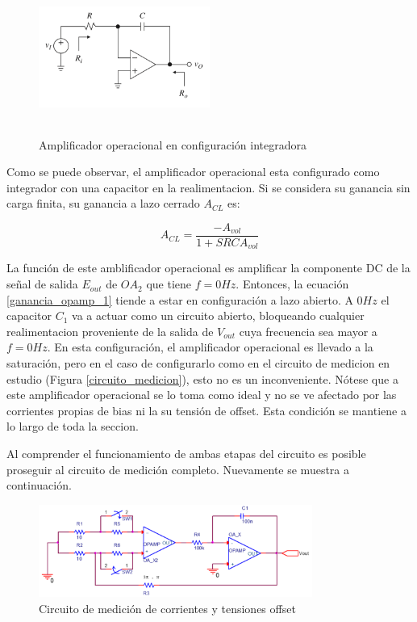 \begin{figure}[ht]                                                       
    \centering\includegraphics[width=0.5\textwidth, height=5cm]{../Ex3/Figuras/fig_4.png}
     \caption{Amplificador operacional en configuración integradora}
     \label{fig_4}
     \end{figure}


Como se puede observar, el amplificador operacional esta configurado como integrador con una capacitor en la realimentacion. Si se considera su ganancia sin carga finita, su ganancia a lazo cerrado $A_{CL}$ es:

\begin{equation} A_{CL}= \frac{-A_{vol}}{1+SRC A_{vol}}  \label{ganancia_opamp_1} \end{equation}

La función de este amblificador operacional es amplificar la componente DC de la señal de salida $E_{out}$ de $OA_2$ que tiene $f=0Hz$. Entonces, la ecuación 
\ref{ganancia_opamp_1} tiende a estar en configuración a lazo abierto. A $0Hz$ el capacitor $C_{1}$ va a actuar como un circuito abierto, bloqueando cualquier realimentacion
proveniente de la salida de $V_{out}$ cuya frecuencia sea mayor a $f=0Hz$. En esta configuración, el amplificador operacional es llevado a la saturación, pero en el caso de configurarlo como en el circuito de medicion en estudio (Figura \ref{circuito_medicion}), esto no es 
un inconveniente. Nótese que a este amplificador operacional se lo toma como ideal y no se ve afectado por las corrientes propias de bias ni la su tensión de offset. Esta condición se mantiene a lo largo de toda la seccion. 

Al comprender el funcionamiento de ambas etapas del circuito es posible proseguir al circuito de medición completo. Nuevamente se muestra a continuación.

\begin{figure}[ht]                                                       
    \centering\includegraphics[width=0.8\textwidth]{../Ex3/Figuras/circuito_medicion.png}
     \caption{Circuito de medición de corrientes y tensiones offset}
     \end{figure}

